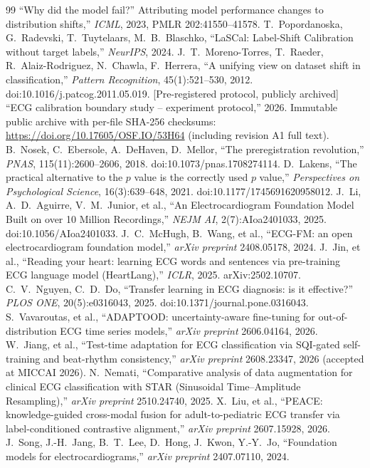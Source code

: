 \documentclass[12pt]{article}
\begin{document}
\begin{thebibliography}{99}
``Why did the model fail?'' Attributing model performance changes to
distribution shifts,'' \emph{ICML}, 2023, PMLR 202:41550--41578.
 T.~Popordanoska, G.~Radevski, T.~Tuytelaars,
M.~B.~Blaschko, ``LaSCal: Label-Shift Calibration without target
labels,'' \emph{NeurIPS}, 2024.
 J.~T.~Moreno-Torres, T.~Raeder,
R.~Alaiz-Rodriguez, N.~Chawla, F.~Herrera, ``A unifying view on
dataset shift in classification,'' \emph{Pattern Recognition},
45(1):521--530, 2012. doi:10.1016/j.patcog.2011.05.019.
 [Pre-registered protocol, publicly archived] ``ECG
calibration boundary study -- experiment protocol,'' 2026. Immutable
public archive with per-file SHA-256 checksums:
\url{https://doi.org/10.17605/OSF.IO/53H64} (including revision A1 full
text).
 B.~Nosek, C.~Ebersole, A.~DeHaven,
D.~Mellor, ``The preregistration revolution,'' \emph{PNAS},
115(11):2600--2606, 2018. doi:10.1073/pnas.1708274114.
 D.~Lakens, ``The practical alternative to
the $p$ value is the correctly used $p$ value,''
\emph{Perspectives on Psychological Science}, 16(3):639--648, 2021.
doi:10.1177/1745691620958012.
 J.~Li, A.~D.~Aguirre, V.~M.~Junior, et al.,
``An Electrocardiogram Foundation Model Built on over 10 Million
Recordings,'' \emph{NEJM AI},
2(7):AIoa2401033, 2025. doi:10.1056/AIoa2401033.
 J.~C.~McHugh, B.~Wang, et al., ``ECG-FM: an open
electrocardiogram foundation model,'' \emph{arXiv preprint}
2408.05178, 2024.
 J.~Jin, et al., ``Reading your heart: learning
ECG words and sentences via pre-training ECG language model
(HeartLang),'' \emph{ICLR}, 2025. arXiv:2502.10707.
 C.~V.~Nguyen, C.~D.~Do, ``Transfer learning in ECG
diagnosis: is it effective?'' \emph{PLOS ONE}, 20(5):e0316043, 2025.
doi:10.1371/journal.pone.0316043.
 S.~Vavaroutas, et al., ``ADAPTOOD:
uncertainty-aware fine-tuning for out-of-distribution ECG time series
models,'' \emph{arXiv preprint} 2606.04164, 2026.
 W.~Jiang, et al., ``Test-time adaptation for ECG
classification via SQI-gated self-training and beat-rhythm
consistency,'' \emph{arXiv preprint} 2608.23347, 2026 (accepted at
MICCAI 2026).
 N.~Nemati, ``Comparative analysis of data
augmentation for clinical ECG classification with STAR (Sinusoidal
Time--Amplitude Resampling),'' \emph{arXiv preprint} 2510.24740, 2025.
 X.~Liu, et al., ``PEACE: knowledge-guided
cross-modal fusion for adult-to-pediatric ECG transfer via
label-conditioned contrastive alignment,'' \emph{arXiv preprint}
2607.15928, 2026.
 J.~Song, J.-H.~Jang, B.~T.~Lee, D.~Hong,
J.~Kwon, Y.-Y.~Jo, ``Foundation models for electrocardiograms,''
\emph{arXiv preprint} 2407.07110, 2024.
\end{thebibliography}
\end{document}
